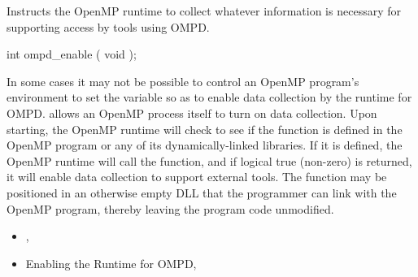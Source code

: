 \summary
Instructs the OpenMP runtime to collect whatever information
is necessary for supporting access by tools using OMPD.


\begin{cspecific}
\begin{ompSyntax}
int ompd_enable ( void );
\end{ompSyntax}
\end{cspecific}


\descr

In some cases it may not be possible to control an OpenMP program's
environment to set the  variable so as to enable
data collection by the runtime for OMPD.
 allows an OpenMP process itself to turn on data collection.
Upon starting, the OpenMP runtime will check to see if the function
 is defined in the OpenMP program or any of
its dynamically-linked libraries.
If it is defined, the OpenMP runtime will call the function,
and if logical true (non-zero) is returned, it will enable data
collection to support external tools.
The function may be positioned in an otherwise empty DLL that the
programmer can link with the OpenMP program, thereby leaving
the program code unmodified.

\crossreferences
\begin{itemize}
\item
  , 
\item
  Enabling the Runtime for OMPD, 
\end{itemize}
